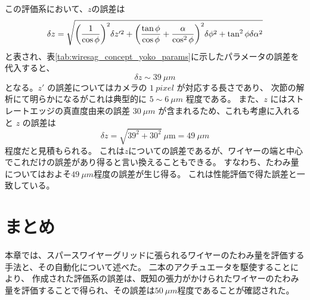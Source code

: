 \documentclass[../../main.tex]{subfiles}
\begin{document}
この評価系において、$z$の誤差は
\begin{align}
    \delta z = \sqrt{\qty(\dfrac{1}{\cos\phi})^2\delta z'^2 + \qty(\dfrac{\tan\phi}{\cos\phi}+\dfrac{\alpha}{\cos^2\phi})^2\delta\phi^2 + \tan^2\phi\delta\alpha^2}
\end{align}
と表され、表\ref{tab:wiresag_concept_yoko_params}に示したパラメータの誤差を代入すると、
\begin{equation}
    \delta z \sim \SI{39}{\mu m}
\end{equation}
となる。$z'$ の誤差についてはカメラの $\SI{1}{pixel}$ が対応する長さであり、
次節の解析にて明らかになるがこれは典型的に $5\sim\SI{6}{\mu m}$ 程度である。
また、$z$ にはストレートエッジの真直度由来の誤差 $\SI{30}{\mu m}$ が含まれるため、これも考慮に入れると $z$ の誤差は
\begin{equation}
    \delta z = \sqrt{39^2+30^2}\ \mu\mathrm{m} = \SI{49}{\mu m}
\end{equation}
程度だと見積もられる。
これは$z$についての誤差であるが、ワイヤーの端と中心でこれだけの誤差があり得ると言い換えることもできる。
すなわち、たわみ量についてはおよそ$\SI{49}{\mu m}$程度の誤差が生じ得る。
これは性能評価で得た誤差と一致している。


\section{まとめ}
本章では、スパースワイヤーグリッドに張られるワイヤーのたわみ量を評価する手法と、その自動化について述べた。
二本のアクチュエータを駆使することにより、
作成された評価系の誤差は、既知の張力がかけられたワイヤーのたわみ量を評価することで得られ、その誤差は$\SI{50}{\mu m}$程度であることが確認された。
\end{document}
